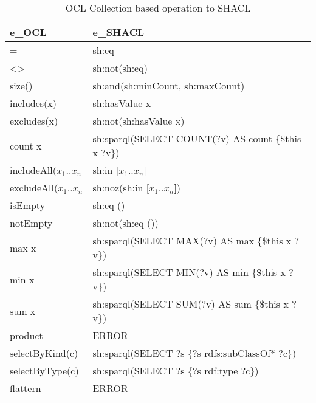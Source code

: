 \documentclass[runningheads]{llncs}
\begin{document}
\begin{table}[h]
    \centering
    \begin{tabular}{|l|l|}
        \hline
        \textbf{e_{OCL}}          & \textbf{e_{SHACL}}                                   \\\hline
        =                         & sh:eq                                                \\
        \textless{}\textgreater{} & sh:not(sh:eq)                                        \\
        size()                    & sh:and(sh:minCount, sh:maxCount)                     \\
        includes(x)               & sh:hasValue x                                        \\
        excludes(x)               & sh:not(sh:hasValue x)                                \\
        count x                   & sh:sparql(SELECT COUNT(?v) AS count \{\$this x ?v\}) \\
        includeAll(\(x_1 .. x_n\) & sh:in [\(x_1 .. x_n\)]                               \\
        excludeAll(\(x_1 .. x_n\) & sh:noz(sh:in [\(x_1 .. x_n\)])                       \\
        isEmpty                   & sh:eq ()                                             \\
        notEmpty                  & sh:not(sh:eq ())                                     \\
        max x                     & sh:sparql(SELECT MAX(?v) AS max \{\$this x ?v\})     \\
        min x                     & sh:sparql(SELECT MIN(?v) AS min \{\$this x ?v\})     \\
        sum x                     & sh:sparql(SELECT SUM(?v) AS sum \{\$this x ?v\})     \\
        product                   & ERROR                                                \\
        selectByKind(c)           & sh:sparql(SELECT ?s \{?s rdfs:subClassOf* ?c\})      \\
        selectByType(c)           & sh:sparql(SELECT ?s \{?s rdf:type ?c\})              \\
        flattern                  & ERROR                                                \\\hline
    \end{tabular}
    \label{SHACLColExp}
    \caption{OCL Collection based operation to SHACL}
\end{table}
\end{document}
